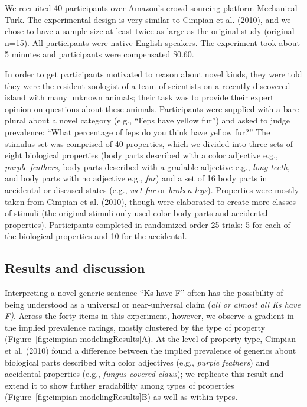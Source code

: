 \documentclass[floatsintext,doc]{apa6}
\newcommand{\ndg}[1]{{\textcolor{Green}{[ndg: #1]}}}
\begin{document}
We recruited 40 participants over Amazon's crowd-sourcing platform Mechanical Turk.
The experimental design is very similar to Cimpian et al. (2010), and we chose to have a sample size at least twice as large as the original study (original n=15).
All participants were native English speakers.
The experiment took about 5 minutes and participants were compensated \$0.60.


In order to get participants motivated to reason about novel kinds, they were told they were the resident zoologist of a team of scientists on a recently discovered island with many unknown animals; their task was to provide their expert opinion on questions about these animals.
Participants were supplied with a bare plural about a novel category (e.g., \enquote{Feps have yellow fur}) and asked to judge prevalence: \enquote{What percentage of feps do you think have yellow fur?}
The stimulus set was comprised of 40 properties, which we divided into three sets of eight biological properties (body parts described with a color adjective e.g., \emph{purple feathers}, body parts described with a gradable adjective  e.g., \emph{long teeth}, and body parts with no adjective e.g., \emph{fur}) and a set of 16 body parts in accidental or diseased states (e.g., \emph{wet fur} or \emph{broken legs}).
Properties were mostly taken from Cimpian et al. (2010), though were elaborated to create more classes of stimuli (the original stimuli only used color body parts and accidental properties). 
Participants completed in randomized order 25 trials: 5 for each of the biological properties and 10 for the accidental.

\hypertarget{results-and-discussion}{%
\subsection{Results and discussion}\label{results-and-discussion}}

Interpreting a novel generic sentence \enquote{Ks have F} often has the possibility of being understood as a universal or near-universal claim (\emph{all or almost all Ks have F)}.
Across the forty items in this experiment, however, we observe a gradient in the implied prevalence ratings, mostly clustered by the type of property (Figure~\ref{fig:cimpian-modelingResults}A).
At the level of property type, Cimpian et al. (2010) found a difference between the implied prevalence of generics about biological parts described with color adjectives (e.g., \emph{purple feathers}) and accidental properties (e.g., \emph{fungus-covered claws});  we replicate this result and extend it to show further gradability among types of properties (Figure~\ref{fig:cimpian-modelingResults}B) as well as within types.
\end{document}
